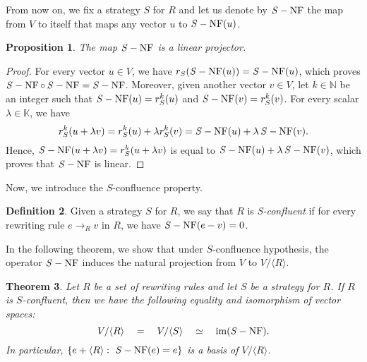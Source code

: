 \documentclass[11pt]{article}
\newtheorem{theorem}{Theorem}[section]
\newtheorem{proposition}[theorem]{Proposition}
\theoremstyle{definition}
\newtheorem{definition}[theorem]{Definition}
\newcommand\K{\mathbb{K}}
\newcommand\N{\mathbb{N}}
\newcommand\Span[1]{\langle #1\rangle}
\DeclareMathOperator{\im}{im}
\newcommand\rewR{\to_R}
\DeclareMathOperator{\SNF}{{\it S}-NF}
\begin{document}
From now on, we fix a strategy $S$ for $R$ and let us denote by $\SNF$
the map from $V$ to itself that maps any vector $u$ to $\SNF(u)$.
\smallskip

\begin{proposition}\label{prop:SNF_projector}
  The map $\SNF$ is a linear projector.
\end{proposition}

\begin{proof}
  For every vector $u\in V$, we have $r_S(\SNF(u))=\SNF(u)$, which proves 
  $\SNF\circ\SNF=\SNF$. Moreover, given another vector $v\in V$, let
  $k\in\N$ be an integer such that $\SNF(u)=r_S^k(u)$ and
  $\SNF(v)=r_S^k(v)$. For every scalar $\lambda\in\K$, we have 
  \[r^k_S(u+\lambda v)=r^k_S(u)+\lambda r^k_S(v)=\SNF(u)+\lambda\SNF(v).
  \]
  Hence, $\SNF(u+\lambda v)=r^k_S(u+\lambda v)$ is equal to
  $\SNF(u)+\lambda\SNF(v)$, which proves that $\SNF$ is linear.
\end{proof}

\smallskip

Now, we introduce the $S$-confluence property. 
\smallskip

\begin{definition}\label{def:standardisation_property}
  Given a strategy $S$ for $R$, we say that $R$ is \emph{S-confluent} if
  for every rewriting rule $e\rewR v$ in $R$, we have $\SNF(e-v)=0$.
\end{definition}
\smallskip

In the following theorem, we show that under $S$-confluence hypothesis,
the operator $\SNF$ induces the natural projection from $V$ to
$V/\Span{R}$.
\medskip

\begin{theorem}\label{thm:SNF_decompo}
  Let $R$ be a set of rewriting rules and let $S$ be a strategy for $R$.  If $R$
  is $S$-confluent, then we have the following equality and isomorphism of
  vector spaces:
  \begin{equation}\label{equ:iso_SNF}
    V/\Span{R} \quad = \quad V/\Span{S} \quad \simeq \quad\im(\SNF).
  \end{equation}
  In particular, $\{e+\Span{R}:\ \SNF(e)=e\}$ is a basis of
  $V/\Span{R}$.
\end{theorem}
\end{document}
